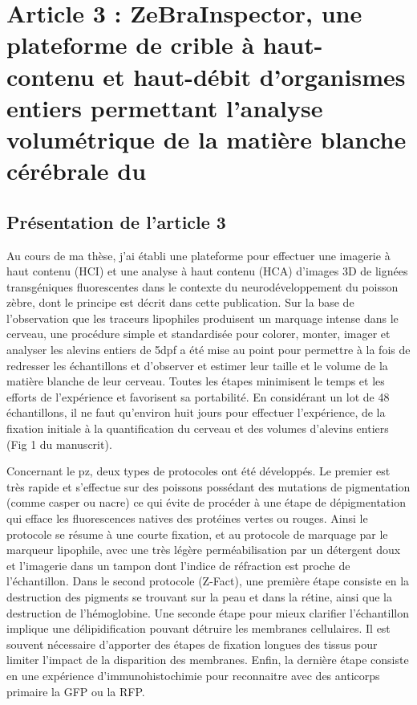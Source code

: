 \documentclass[\main/main.tex]{subfiles}
\begin{document}
\chapter{
    \label{sec:lempereur_bio}
    Article 3 : ZeBraInspector, une plateforme de crible à haut-contenu et haut-débit d'organismes entiers permettant l'analyse volumétrique de la matière blanche cérébrale du \pz{}
    }
    
\section{Présentation de l'article 3}
    
Au cours de ma thèse, j'ai établi une plateforme pour effectuer une imagerie à haut contenu (HCI) et une analyse à haut contenu (HCA) d'images 3D de lignées transgéniques fluorescentes dans le contexte du neurodéveloppement du poisson zèbre, dont le principe est décrit dans cette publication. Sur la base de l'observation que les traceurs lipophiles produisent un marquage intense dans le cerveau, une procédure simple et standardisée pour colorer, monter, imager et analyser les alevins entiers de 5dpf a été mise au point pour permettre à la fois de redresser les échantillons et d'observer et estimer leur taille et le volume de la matière blanche de leur cerveau. Toutes les étapes minimisent le temps et les efforts de l'expérience et favorisent sa portabilité. En considérant un lot de 48 échantillons, il ne faut qu'environ huit jours pour effectuer l'expérience, de la fixation initiale à la quantification du cerveau et des volumes d'alevins entiers (Fig 1 du manuscrit).

%
Concernant le pz{}, deux types de protocoles ont été développés.
Le premier est très rapide et s'effectue sur des poissons possédant des mutations de pigmentation (comme casper ou nacre) ce qui évite de procéder à une étape de dépigmentation qui efface les fluorescences natives des protéines vertes ou rouges. Ainsi le protocole se résume à une courte fixation, et au protocole de marquage par le marqueur lipophile, avec une très légère perméabilisation par un détergent doux et l'imagerie dans un tampon dont l'indice de réfraction est proche de l'échantillon.
Dans le second protocole (Z-Fact), une première étape consiste en la destruction des pigments se trouvant sur la peau
et dans la rétine, ainsi que la destruction de l'hémoglobine.
%
Une seconde étape pour mieux clarifier l'échantillon implique une  délipidification pouvant détruire les membranes cellulaires. Il est souvent nécessaire d'apporter des étapes de fixation longues des tissus pour limiter l'impact de la disparition des membranes.
%
Enfin, la dernière étape consiste en une expérience d'immunohistochimie pour reconnaitre avec des anticorps primaire la GFP ou la RFP.
\end{document}
